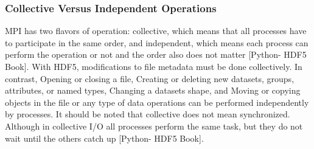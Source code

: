 \subsubsection{Collective Versus Independent Operations} 
MPI has two flavors of operation: collective, which means that all processes have to participate in the same order, and independent, which means each process can perform the operation or not and the order also does not matter  [Python- HDF5 Book].
With HDF5, modifications to file metadata must be done collectively. 
In contrast, Opening or closing a file, Creating or deleting new datasets, groups, attributes, or named types, Changing a datasets shape, and Moving or copying objects in the file or any type of data operations can be performed independently by processes.
It should be noted that collective does not mean synchronized.
Although in collective I/O all processes perform the same task, but they do not wait until the others catch up [Python- HDF5 Book]. 
